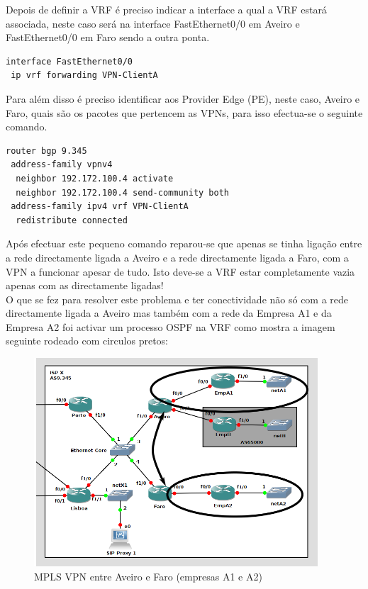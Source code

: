\documentclass[11pt,a4paper]{report}
\begin{document}
Depois de definir a VRF é preciso indicar a interface a qual a VRF estará associada, neste caso será na interface FastEthernet0/0 em Aveiro e FastEthernet0/0 em Faro sendo a outra ponta.

\begin{lstlisting}[caption=VPN - Associar a VRF a uma interface]
interface FastEthernet0/0
 ip vrf forwarding VPN-ClientA
\end{lstlisting}


Para além disso é preciso identificar aos Provider Edge (PE), neste caso, Aveiro e Faro, quais são os pacotes que pertencem as VPNs, para isso efectua-se o seguinte comando.\\

\begin{lstlisting}[caption=VPN - Anunciar os labels das VPNs]
router bgp 9.345
 address-family vpnv4
  neighbor 192.172.100.4 activate
  neighbor 192.172.100.4 send-community both
 address-family ipv4 vrf VPN-ClientA
  redistribute connected
\end{lstlisting}

Após efectuar este pequeno comando reparou-se que apenas se tinha ligação entre a rede directamente ligada a Aveiro e a rede directamente ligada a Faro, com a VPN a funcionar apesar de tudo. Isto deve-se a VRF estar completamente vazia apenas com as directamente ligadas!\\

O que se fez para resolver este problema e ter conectividade não só com a rede directamente ligada a Aveiro mas também com a rede da Empresa A1 e da Empresa A2 foi activar um processo OSPF na VRF como mostra a imagem seguinte rodeado com circulos pretos:\\

\begin{figure}[H]
\centerline{\includegraphics[width=300pt]{network_vpn.png}}
\caption{MPLS VPN entre Aveiro e Faro (empresas A1 e A2)}
\label{schema}
\end{figure}
\end{document}
